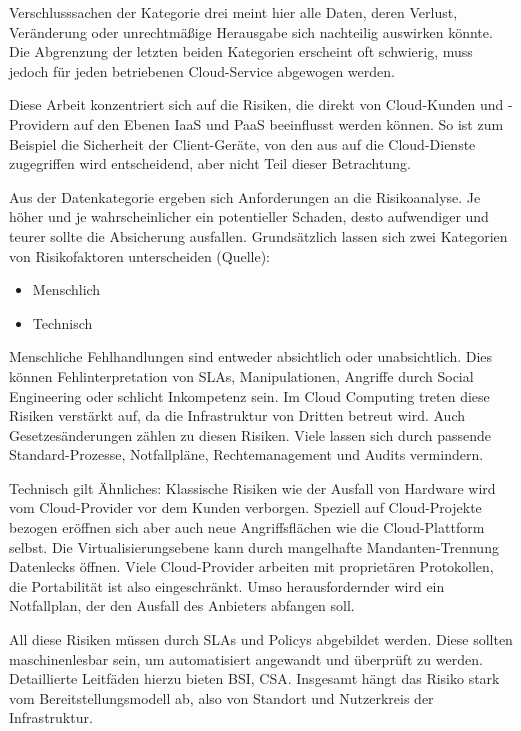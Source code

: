 \noindent
Verschlusssachen der Kategorie drei meint hier alle Daten, deren Verlust, Veränderung oder unrechtmäßige Herausgabe sich nachteilig auswirken könnte. Die Abgrenzung der letzten beiden Kategorien erscheint oft schwierig, muss jedoch für jeden betriebenen Cloud-Service abgewogen werden.

Diese Arbeit konzentriert sich auf die Risiken, die direkt von Cloud-Kunden und -Providern auf den Ebenen IaaS und PaaS beeinflusst werden können. So ist zum Beispiel die Sicherheit der Client-Geräte, von den aus auf die Cloud-Dienste zugegriffen wird entscheidend, aber nicht Teil dieser Betrachtung.

Aus der Datenkategorie ergeben sich Anforderungen an die Risikoanalyse. Je höher und je wahrscheinlicher ein potentieller Schaden, desto aufwendiger und teurer sollte die Absicherung ausfallen. Grundsätzlich lassen sich zwei Kategorien von Risikofaktoren unterscheiden (Quelle):
\begin{itemize}
	\item Menschlich
	\item Technisch
\end{itemize}

\noindent Menschliche Fehlhandlungen sind entweder absichtlich oder unabsichtlich. Dies können Fehlinterpretation von SLAs, Manipulationen, Angriffe durch Social Engineering oder schlicht Inkompetenz sein. Im Cloud Computing treten diese Risiken verstärkt auf, da die Infrastruktur von Dritten betreut wird. Auch Gesetzesänderungen zählen zu diesen Risiken. Viele lassen sich durch passende Standard-Prozesse, Notfallpläne, Rechtemanagement und Audits vermindern.

Technisch gilt Ähnliches: Klassische Risiken wie der Ausfall von Hardware wird vom Cloud-Provider vor dem Kunden verborgen. Speziell auf Cloud-Projekte bezogen eröffnen sich aber auch neue Angriffsflächen wie die Cloud-Plattform selbst. Die Virtualisierungsebene kann durch mangelhafte Mandanten-Trennung Datenlecks öffnen. Viele Cloud-Provider arbeiten mit proprietären Protokollen, die Portabilität ist also eingeschränkt. Umso herausfordernder wird ein Notfallplan, der den Ausfall des Anbieters abfangen soll.

All diese Risiken müssen durch SLAs und Policys abgebildet werden. Diese sollten maschinenlesbar sein, um automatisiert angewandt und überprüft zu werden. Detaillierte Leitfäden hierzu bieten BSI, CSA. Insgesamt hängt das Risiko stark vom Bereitstellungsmodell ab, also von Standort und Nutzerkreis der Infrastruktur.

